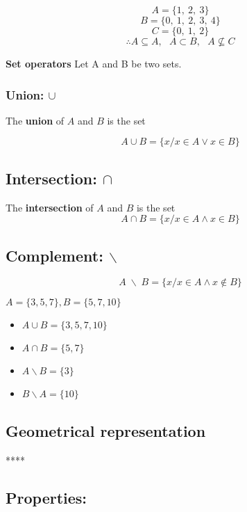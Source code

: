 \documentclass[12pt, a4paper]{book}
\begin{document}
\begin{exmp}
  \[
    A= \{ 1, \ 2, \ 3\} 
  \]
  \[
    B= \{ 0, \ 1, \ 2, \ 3, \ 4 \}
  \]
  \[
    C= \{ 0, \ 1, \ 2 \}
  \]
  \[
    \therefore
    A \subseteq A, \ \ \ A \subset B, \ \ \ A \nsubseteq C
  \]
\end{exmp}

\begin{defn}
  \textbf{Set operators}
  Let A and B be two sets. 
\end{defn}
\boldmath
\subsubsection*{Union: $\cup$}

The \textbf{union} of $A$ and $B$ is the set

\[ 
  A \cup B = \{x/x \in A \vee x \in B \}
\]

\subsection*{Intersection: $\cap$}

The \textbf{intersection} of $A$ and $B$ is the set
\[
  A \cap B = \{x/x \in A \wedge x \in B \}
\]

\subsection*{Complement: $\backslash$}

\[
  A \; \backslash \; B = \{x/x \in A \wedge x \notin B \}
\]
\unboldmath
\begin{exmp}
  $A=\{3,5,7\}, B=\{5,7,10\}$
  \begin{itemize}
    \item $A \cup B = \{3,5,7,10\}$
    \item $A \cap B = \{5,7\}$
    \item $A \backslash B = \{3\}$
    \item $B \backslash A = \{10\}$
  \end{itemize}
\end{exmp}

\subsection*{Geometrical representation}

****

\subsection*{Properties: }
\end{document}
